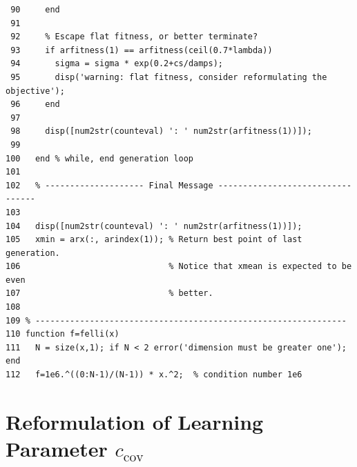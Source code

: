 \documentclass{article} %
\newcommand{\kom}[1]{}
\newcommand{\ve}[1]{\mathchoice{\mbox{\boldmath$\displaystyle#1$}}
  {\mbox{\boldmath$\textstyle#1$}} {\mbox{\boldmath$\scriptstyle#1$}}
  {\mbox{\boldmath$\scriptscriptstyle#1$}}}
\newcommand{\T}{\ensuremath{\mathsf{T}}}
\newcommand{\rklam}[1]{\left({#1}\right)}
\newcommand{\mucov}{\mu_\mathrm{cov}}
\newcommand{\summ}[2]{\sum_{#1=1}^{#2}}
\newcommand{\lam}{\ensuremath{\lambda}}
\newcommand{\pc}{\ve{p}_\mathrm{c}}
\newcommand{\y}{\ve{y}}
\newcommand{\ilam}{{i:\lam}}
\newcommand{\ccov}{\ensuremath{c_{\mathrm{cov}}}}
\begin{document}
\begin{appendix}
\begin{scriptsize}
\begin{verbatim}
 90     end
 91 
 92     % Escape flat fitness, or better terminate? 
 93     if arfitness(1) == arfitness(ceil(0.7*lambda))
 94       sigma = sigma * exp(0.2+cs/damps); 
 95       disp('warning: flat fitness, consider reformulating the objective');
 96     end
 97     
 98     disp([num2str(counteval) ': ' num2str(arfitness(1))]);
 99 
100   end % while, end generation loop
101 
102   % -------------------- Final Message ---------------------------------
103 
104   disp([num2str(counteval) ': ' num2str(arfitness(1))]);
105   xmin = arx(:, arindex(1)); % Return best point of last generation.
106                              % Notice that xmean is expected to be even
107                              % better.
108   
109 % ---------------------------------------------------------------  
110 function f=felli(x)
111   N = size(x,1); if N < 2 error('dimension must be greater one'); end
112   f=1e6.^((0:N-1)/(N-1)) * x.^2;  % condition number 1e6
 \end{verbatim}
 \kom{
   if arfitness(1) == arfitness(min(1+floor(lambda/2), 2+ceil(lambda/4)))
       sigma = sigma * exp(0.2+cs/damps); 
   end
 }
\end{scriptsize}

\newpage
\section{Reformulation of Learning Parameter $\ccov$}  



\end{appendix}
\end{document}

